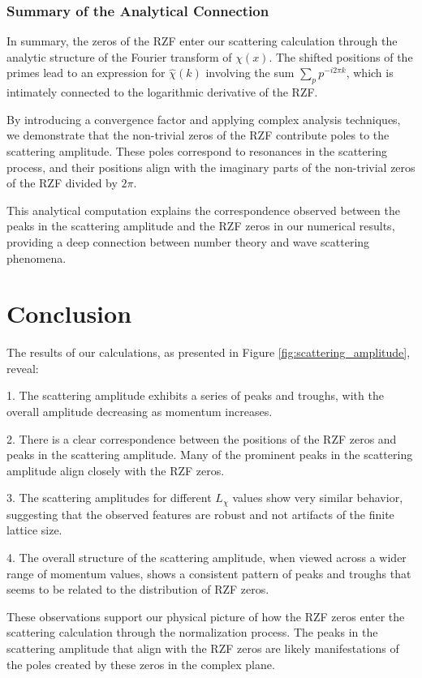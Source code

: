 \documentclass[11pt, oneside]{article}
\begin{document}
\subsubsection{Summary of the Analytical Connection}

In summary, the zeros of the RZF enter our scattering calculation through the analytic structure of the Fourier transform of $\chi(x)$. The shifted positions of the primes lead to an expression for $\hat{\chi}(k)$ involving the sum $\sum_{p} p^{-i 2\pi k}$, which is intimately connected to the logarithmic derivative of the RZF.

By introducing a convergence factor and applying complex analysis techniques, we demonstrate that the non-trivial zeros of the RZF contribute poles to the scattering amplitude. These poles correspond to resonances in the scattering process, and their positions align with the imaginary parts of the non-trivial zeros of the RZF divided by $2\pi$.

This analytical computation explains the correspondence observed between the peaks in the scattering amplitude and the RZF zeros in our numerical results, providing a deep connection between number theory and wave scattering phenomena.


\section{Conclusion}

The results of our calculations, as presented in Figure \ref{fig:scattering_amplitude}, reveal:

1. The scattering amplitude exhibits a series of peaks and troughs, with the overall amplitude decreasing as momentum increases.

2. There is a clear correspondence between the positions of the RZF zeros and peaks in the scattering amplitude. Many of the prominent peaks in the scattering amplitude align closely with the RZF zeros.

3. The scattering amplitudes for different $L_\chi$ values show very similar behavior, suggesting that the observed features are robust and not artifacts of the finite lattice size.

4. The overall structure of the scattering amplitude, when viewed across a wider range of momentum values, shows a consistent pattern of peaks and troughs that seems to be related to the distribution of RZF zeros.

These observations support our physical picture of how the RZF zeros enter the scattering calculation through the normalization process. The peaks in the scattering amplitude that align with the RZF zeros are likely manifestations of the poles created by these zeros in the complex plane.
\end{document}
